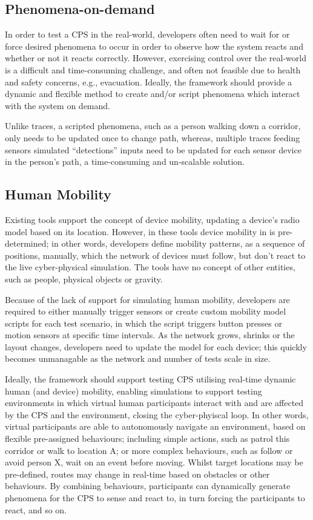 \subsection{Phenomena-on-demand}
\label{sub:requirements_Phenomena-on-demand}
In order to test a CPS in the real-world, developers often need to wait for or force desired phenomena to occur in order to observe how the system reacts and whether or not it reacts correctly. However, exercising control over the real-world is a difficult and time-consuming challenge, and often not feasible due to health and safety concerns, e.g., evacuation. 
Ideally, the framework should provide a dynamic and flexible method to create and/or script phenomena which interact with the system on demand.

Unlike traces, a scripted phenomena, such as a person walking down a corridor, only needs to be updated once to change path, whereas, multiple traces feeding sensors simulated ``detections'' inputs need to be updated for each sensor device in the person's path, a time-consuming and un-scalable solution.


\subsection{Human Mobility} %
\label{sub:requirements_mobility}
Existing tools support the concept of device mobility, updating a device's radio model based on its location. However, in these tools device mobility in is pre-determined; in other words, developers define mobility patterns, as a sequence of positions, manually, which the network of devices must follow, but don't react to the live cyber-physical simulation. The tools have no concept of other entities, such as people, physical objects or gravity.

Because of the lack of support for simulating human mobility, developers are required to either manually trigger sensors or create custom mobility model scripts for each test scenario, in which the script triggers button presses or motion sensors at specific time intervals. As the network grows, shrinks or the layout changes, developers need to update the model for each device; this quickly becomes unmanagable as the network and number of tests scale in size.

Ideally, the framework should support testing CPS utilising real-time dynamic human (and device) mobility, enabling simulations to support testing environments in which virtual human participants interact with and are affected by the CPS and the environment, closing the cyber-phyiscal loop. In other words, virtual participants are able to autonomously navigate an environment, based on flexible pre-assigned behaviours; including simple actions, such as patrol this corridor or walk to location A; or more complex behaviours, such as follow or avoid person X, wait on an event before moving. Whilst target locations may be pre-defined, routes may change in real-time based on obstacles or other behaviours. By combining behaviours, participants can dynamically generate phenomena for the CPS to sense and react to, in turn forcing the participants to react, and so on. 

